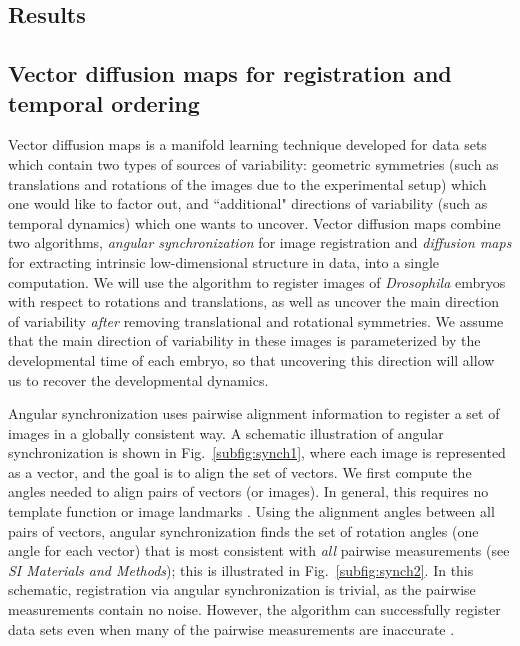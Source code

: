 \documentclass{pnastwo}
\newcommand{\SI}[0]{{\it SI Materials and Methods}}
\newcommand{\fig}[0]{Fig.}
\begin{document}
\begin{article}
\section{Results}

\subsection{Vector diffusion maps for registration and temporal ordering}

Vector diffusion maps \cite{singer2012vector} is a manifold learning
technique developed for data sets which contain two types of sources of variability:
geometric symmetries (such as translations and rotations of the images due to the experimental setup) which one would like to factor out,
and ``additional" directions of variability (such as temporal dynamics) which one wants to uncover.
%
Vector diffusion maps combine two algorithms, {\em angular synchronization} \cite{singer2011angular} for image registration and {\em diffusion maps} \cite{coifman2005geometric} for extracting intrinsic low-dimensional structure in data, into a single computation.
%
We will use the algorithm to register images of {\it Drosophila} embryos with respect to rotations and translations, as well as uncover the main direction of variability {\it after} removing translational and rotational symmetries.
%
We assume that the main direction of variability in these images is parameterized by the developmental time of each embryo, so that uncovering this direction will allow us to recover the developmental dynamics.

Angular synchronization uses pairwise alignment information to register a set of images in a globally consistent way.
%
A schematic illustration of angular synchronization is shown in \fig~\ref{subfig:synch1}, where each image is represented as a vector, and the goal is to align the set of vectors.
%
We first compute the angles needed to align pairs of vectors (or images).  
%
In general, this requires no template function \cite{ahuja2007template} or image landmarks \cite{ian1998statistical}.
%
Using the alignment angles between all pairs of vectors, angular synchronization finds the set of rotation angles (one angle for each vector) that is most consistent with {\it all} pairwise measurements (see \SI); this is illustrated in \fig~\ref{subfig:synch2}.
%
In this schematic, registration via angular synchronization is trivial, as the pairwise measurements contain no noise.
%
However, the algorithm can successfully register data sets even when many of the pairwise measurements are inaccurate \cite{singer2011angular}.
%


\end{article}
\end{document}
